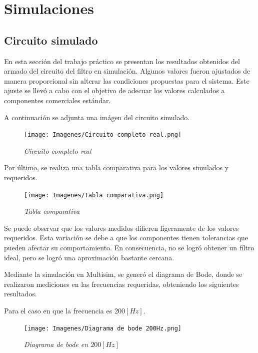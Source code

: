 \documentclass[12pt,A4paper,titlepage]{article}
\begin{document}
\section{Simulaciones}
\subsection{Circuito simulado}
\hspace{1mm} En esta sección del trabajo práctico se presentan los resultados obtenidos del armado del circuito del filtro en simulación. Algunos valores fueron ajustados de manera proporcional sin alterar las condiciones propuestas para el sistema. Este ajuste se llevó a cabo con el objetivo de adecuar los valores calculados a componentes comerciales estándar.

\bigskip
\hspace{1mm} A continuación se adjunta una imágen del circuito simulado.

\begin{figure}[!h] 
  \centering
  \texttt{[image: Imagenes/Circuito completo real.png]}
  \caption{\textit{Circuito completo real}}
\end{figure}

\hspace{1mm} Por último, se realiza una tabla comparativa para los valores simulados y requeridos. 

\begin{figure}[!h] 
  \centering
  \texttt{[image: Imagenes/Tabla comparativa.png]}
  \caption{\textit{Tabla comparativa}}
\end{figure}

\bigskip
\hspace{1mm} Se puede observar que los valores medidos difieren ligeramente de los valores requeridos. Esta variación se debe a que los componentes tienen tolerancias que pueden afectar su comportamiento. En consecuencia, no se logró obtener un filtro ideal, pero se logró una aproximación bastante cercana.

\bigskip
\hspace{1mm} Mediante la simulación en Multisim, se generó el diagrama de Bode, donde se realizaron mediciones en las frecuencias requeridas, obteniendo los siguientes resultados.

\newpage
\hspace{1mm} Para el caso en que la frecuencia es \(200 [Hz]\).

\begin{figure}[!h] 
  \centering
  \texttt{[image: Imagenes/Diagrama de bode 200Hz.png]}
  \caption{\textit{Diagrama de bode en \(200 [Hz]\)}}
\end{figure}
\end{document}
